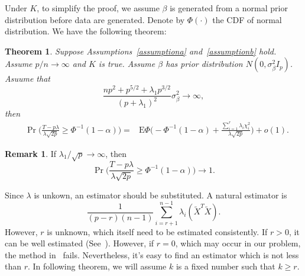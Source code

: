 \documentclass[review]{elsarticle}
\theoremstyle{plain}
\newtheorem{theorem}{\quad\quad Theorem}
\theoremstyle{definition}
\newtheorem{remark}{\quad\quad Remark}
\theoremstyle{remark}
\begin{document}
Under $K$, to simplify the proof, we assume $\beta$ is generated from a normal prior distribution before data are generated. Denote by $\Phi(\cdot)$ the CDF of normal distribution. We have the following theorem:
\begin{theorem}\label{theoremc}
   Suppose Assumptions~\ref{assumptiona} and~\ref{assumptionb} hold.
    Assume $p/n \to  \infty$ and $K$ is true. Assume $\beta$ has prior distribution $N(0,\sigma_\beta^2 I_p)$. Asuume that
\begin{equation}
    \frac{np^2+p^{5/2}+\lambda_1 p^{3/2}}{{(p+\lambda_1)}^2}\sigma^2_{\beta}\to \infty,
\end{equation}
then
\begin{equation}
    \begin{aligned}
        &\Pr\Big(\frac{T-p\lambda}{\lambda\sqrt{2p}}\geq \Phi^{-1}(1-\alpha)\Big)
        =& \textrm{E}\Phi\Big( -\Phi^{-1}(1-\alpha) +\frac{\sum_{i=1}^r \lambda_i \chi^2_i}{\lambda\sqrt{2p}} \Big)+o(1).
    \end{aligned}
\end{equation}
\end{theorem}
\begin{remark}
    If $\lambda_1/\sqrt{p}\to \infty$, then 
\begin{equation} 
    \Pr\Big(\frac{T-p\lambda}{\lambda\sqrt{2p}}\geq \Phi^{-1}(1-\alpha)\Big)\to 1.
\end{equation}
\end{remark}

Since $\lambda$ is unkown, an estimator should be substituted. A natural estimator is
\begin{equation}
    \frac{1}{(p-r)(n-1)}\sum_{i=r+1}^{n-1}\lambda_{i}(\tilde{X}^T\tilde{X}).
\end{equation}
However, $r$ is unknown, which itself need to be estimated consistently. If $r>0$, it can be well estimated (See~\cite{Ahn2009Eigenvalue}). However, if $r=0$, which may occur in our problem, the method in~\cite{Ahn2009Eigenvalue} fails. Nevertheless, it's easy to find an estimator which is not less than $r$.
In following theorem, we will assume $k$ is a fixed number such that $k\geq r$.
 
\end{document}
